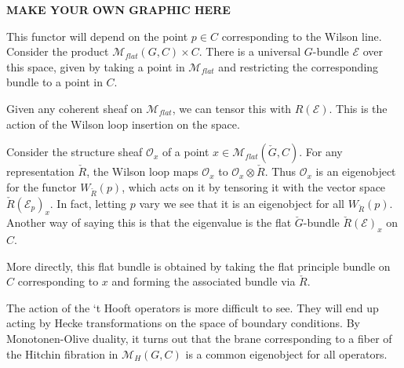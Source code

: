 	\begin{center}
		\textbf{MAKE YOUR OWN GRAPHIC HERE}
	\end{center}
	
	 This functor will depend on the point $p \in C$ corresponding to the Wilson line. Consider the product $\mathcal M_{flat} (G, C) \times C$. There is a universal $G$-bundle $\mathcal E$ over this space, given by taking a point in $\mathcal M_{flat}$ and restricting the corresponding bundle to a point in $C$. 
	
	Given any coherent sheaf on $\mathcal M_{flat}$, we can tensor this with $R(\mathcal E)$. This is the action of the Wilson loop insertion on the space.
	
	Consider the structure sheaf $\mathcal O_x$ of a point $x \in \mathcal M_{flat}(\check G, C)$. For any representation $\check R$, the Wilson loop maps $\mathcal O_x$ to $\mathcal O_x \otimes \check{R}$.
	Thus $\mathcal O_x$ is an eigenobject for the functor $W_{\check R}(p)$, which acts on it by tensoring it with the vector space $\check R(\mathcal E_p)_x$. In fact, letting $p$ vary we see that it is an eigenobject for all $W_{\check R}(p)$. Another way of saying this is that the eigenvalue is the flat $\check G$-bundle $\check R(\mathcal E)_x$ on $C$.
	
	More directly, this flat bundle is obtained by taking the flat principle bundle on $C$ corresponding to $x$ and forming the associated bundle via $\check R$.
	
	The action of the `t Hooft operators is more difficult to see. They will end up acting by Hecke transformations on the space of boundary conditions. By Monotonen-Olive duality, it turns out that the brane corresponding to a fiber of the Hitchin fibration in $\mathcal M_H(G, C)$ is a common eigenobject for all operators.
	
